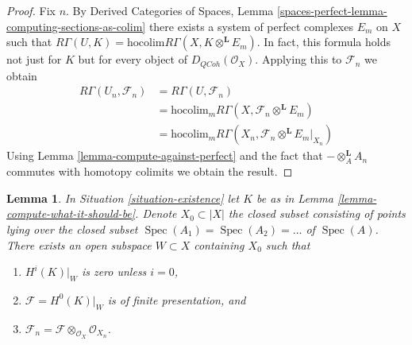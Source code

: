 \documentclass{stacks-project}
\theoremstyle{plain}
\newtheorem{lemma}[subsection]{Lemma}
\theoremstyle{definition}
\theoremstyle{remark}
\numberwithin{equation}{subsection}
\def\Spec{\mathop{\mathrm{Spec}}}
\def\QCoh{\mathit{QCoh}}
\begin{document}
\begin{proof}
Fix $n$. By Derived Categories of Spaces, Lemma
\ref{spaces-perfect-lemma-computing-sections-as-colim}
there exists a system of perfect complexes $E_m$
on $X$ such that
$R\Gamma(U, K) = \text{hocolim} R\Gamma(X, K \otimes^\mathbf{L} E_m)$.
In fact, this formula holds not just for $K$ but for every object of
$D_\QCoh(\mathcal{O}_X)$.
Applying this to $\mathcal{F}_n$
we obtain
\begin{align*}
R\Gamma(U_n, \mathcal{F}_n)
& =
R\Gamma(U, \mathcal{F}_n) \\
& =
\text{hocolim}_m R\Gamma(X, \mathcal{F}_n \otimes^\mathbf{L} E_m) \\
& =
\text{hocolim}_m R\Gamma(X_n, \mathcal{F}_n \otimes^\mathbf{L} E_m|_{X_n})
\end{align*}
Using Lemma \ref{lemma-compute-against-perfect}
and the fact that $- \otimes_A^\mathbf{L} A_n$
commutes with homotopy colimits we obtain the result.
\end{proof}

\begin{lemma}
\label{lemma-finitely-presented}
In Situation \ref{situation-existence} let $K$ be as in
Lemma \ref{lemma-compute-what-it-should-be}.
Denote $X_0 \subset |X|$ the closed subset
consisting of points lying over the closed subset
$\Spec(A_1) = \Spec(A_2) = \ldots$ of $\Spec(A)$.
There exists an open subspace $W \subset X$ containing $X_0$
such that
\begin{enumerate}
\item $H^i(K)|_W$ is zero unless $i = 0$,
\item $\mathcal{F} = H^0(K)|_W$ is of finite presentation, and
\item $\mathcal{F}_n = \mathcal{F} \otimes_{\mathcal{O}_X} \mathcal{O}_{X_n}$.
\end{enumerate}
\end{lemma}
\end{document}
